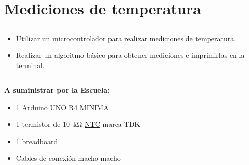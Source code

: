 \chapter{Mediciones de temperatura}
\section{\obj}
\capacidad
\begin{itemize}
\item Utilizar un microcontrolador para realizar mediciones de temperatura.
\item Realizar un algoritmo básico para obtener mediciones e imprimirlas en la terminal.
\end{itemize}

\section{\mat}
\textbf{A suministrar por la Escuela:}
\begin{itemize}
\item 1 Arduino UNO R4 MINIMA
\item 1 termistor de \SI{10}{\kilo\ohm} \href{https://www.tdk-electronics.tdk.com/inf/50/db/ntc/NTC_Leaded_disks_K164.pdf}{NTC} marca TDK 
\item 1 breadboard
\item Cables de conexión macho-macho
\end{itemize}

